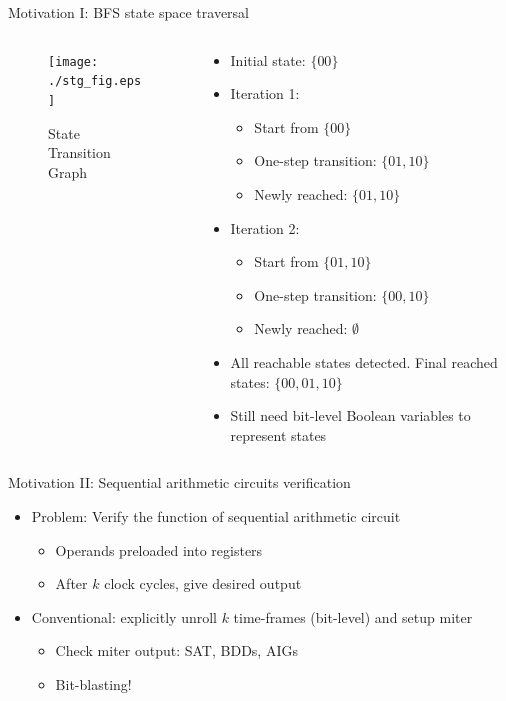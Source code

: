 \documentclass[xcolor=dvipsnames]{beamer}
\newcommand{\bi}{\begin{itemize}}
\newcommand{\ei}{\end{itemize}}
\begin{document}
\begin{frame}[label = linkSTG]{\large{Motivation I: BFS state space traversal}}
\begin{columns}[onlytextwidth]
\begin{column}{0.5\textwidth}
\begin{figure}
\centering
\texttt{[image: ./stg\_fig.eps]}
\caption{State Transition Graph}
\end{figure}
\end{column}
\begin{column}{0.5\textwidth}
\bi
\item Initial state: $\{00\}$
\item Iteration 1: 
	\bi
	\item Start from $\{00\}$
	\item One-step transition: $\{01,10\}$
	\item Newly reached: $\{01,10\}$
	\ei
\item Iteration 2: 
	\bi
	\item Start from $\{01,10\}$
	\item One-step transition: $\{00,10\}$
	\item Newly reached: $\emptyset$
	\ei
\item All reachable states detected. Final reached states: $\{00,01,10\}$
\pause
\item Still need bit-level Boolean variables to represent states
\ei
\end{column}
\end{columns}
\hyperlink{pptpage2}{}
\end{frame}
\begin{frame}[label = motiv2]{\large{Motivation II: Sequential arithmetic circuits verification}}
\vspace{-0.1in}
\begin{figure}[H]
\end{figure}
\vspace{-0.2in}
\bi
\item Problem: Verify the function of sequential arithmetic circuit
	\bi
	\item Operands preloaded into registers
	\item After $k$ clock cycles, give desired output
	\ei
\item Conventional: explicitly unroll $k$ time-frames (bit-level) and setup miter
	\bi
	\item Check miter output: SAT, BDDs, AIGs
	\item Bit-blasting!
	\ei
\ei
\hyperlink{Moore}{}
\hyperlink{expSMPO}{}
\end{frame}
\end{document}
